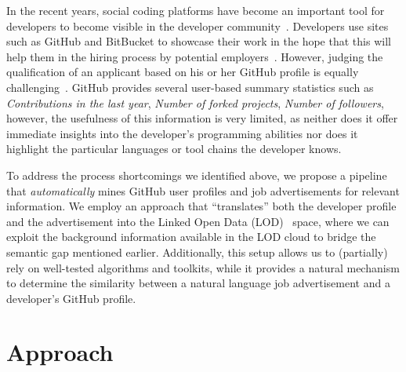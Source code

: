 \documentclass[conference]{IEEEtran}
\begin{document}
In the recent years, social coding platforms have become an important tool for
developers to become visible in the developer community~\cite{Capil13}.
Developers use sites such as GitHub and BitBucket to showcase their work in the
hope that this will help them in the hiring process by potential
employers~\cite{dabbish2012social}. However, judging the qualification of an
applicant based on his or her GitHub profile is equally
challenging~\cite{Singer:2013:MAS:2441776.2441791}. GitHub provides several
user-based summary statistics such as \emph{Contributions in the last year},
\emph{Number of forked projects}, \emph{Number of followers}, however, the
usefulness of this information is very limited, as neither does it offer
immediate insights into the developer's programming abilities nor does it
highlight the particular languages or tool chains the developer knows.

%

To address the process shortcomings we identified above, we propose a pipeline
that \emph{automatically} mines GitHub user profiles and job advertisements for
relevant information. We employ an approach that ``translates'' both the
developer profile and the advertisement into the Linked Open Data
(LOD)~\cite{bizer2009linked} space, where we can exploit the background
information available in the LOD cloud to bridge the semantic gap mentioned
earlier. Additionally, this setup allows us to (partially) rely on well-tested
algorithms and toolkits, while it provides a natural mechanism to determine the
similarity between a natural language job advertisement and a developer's GitHub
profile.


\section{Approach}
\end{document}
